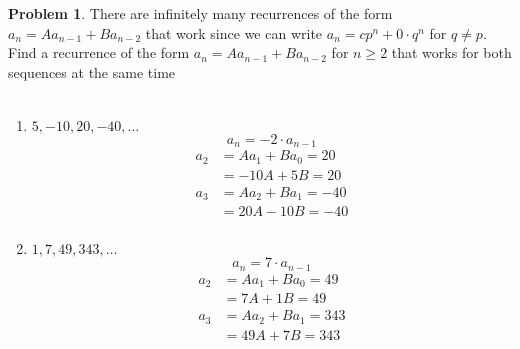 \documentclass[10pt,leqno ]{article}
\theoremstyle{definition}
\newtheorem{problem}[theorem]{Problem}
\begin{document}
\begin{problem} There are infinitely many recurrences of the form $a_n=Aa_{n-1}+Ba_{n-2}$ that work since we can write $a_n=cp^n+ 0 \cdot q^n$ for $q \neq p$.  Find a recurrence of the form $a_n=Aa_{n-1}+Ba_{n-2}$ for $n \geq 2$ that works for both sequences at the same time
\\\\
\Large
\begin{enumerate}[label=\alph*)]
\item $5, -10, 20, -40, \dots$
$$a_n = -2 \cdot a_{n-1}$$
\begin{align*}
a_2 &= Aa_1 + Ba_0 = 20\\
    &= -10A   + 5B = 20\\
a_3 &= Aa_2 + Ba_1 = -40\\
    &= 20A  -10B   = -40\\
\end{align*}
\item $1, 7, 49, 343, \dots$
$$a_n = 7 \cdot a_{n-1}$$
\begin{align*}
a_2 &= Aa_1 + Ba_0 = 49\\
    &= 7A   + 1B = 49\\
a_3 &= Aa_2 + Ba_1 = 343\\
    &= 49A + 7B   = 343\\
\end{align*}
\end{enumerate}
\end{problem}
\newpage
\end{document}
